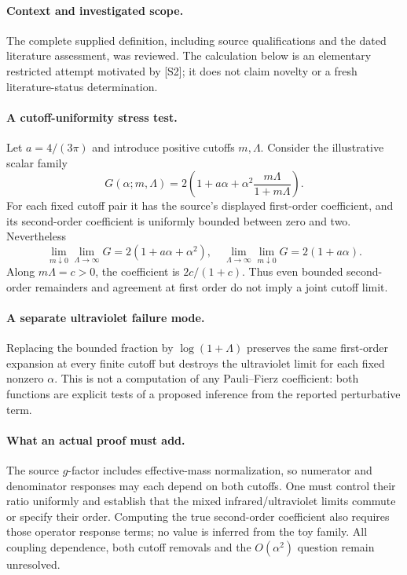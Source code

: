 \documentclass[11pt]{article}
\begin{document}
\paragraph{Context and investigated scope.} The complete supplied definition, including source qualifications and the dated literature assessment, was reviewed. The calculation below is an elementary restricted attempt motivated by [S2]; it does not claim novelty or a fresh literature-status determination.

\paragraph{A cutoff-uniformity stress test.} Let $a=4/(3\pi)$ and introduce positive cutoffs $m,\Lambda$. Consider the illustrative scalar family
\[
 G(\alpha;m,\Lambda)=2\left(1+a\alpha+\alpha^2\frac{m\Lambda}{1+m\Lambda}\right).
\]
For each fixed cutoff pair it has the source's displayed first-order coefficient, and its second-order coefficient is uniformly bounded between zero and two. Nevertheless
\[
 \lim_{m\downarrow0}\lim_{\Lambda\to\infty}G=2(1+a\alpha+\alpha^2),\quad
 \lim_{\Lambda\to\infty}\lim_{m\downarrow0}G=2(1+a\alpha).
\]
Along $m\Lambda=c>0$, the coefficient is $2c/(1+c)$. Thus even bounded second-order remainders and agreement at first order do not imply a joint cutoff limit.

\paragraph{A separate ultraviolet failure mode.} Replacing the bounded fraction by $\log(1+\Lambda)$ preserves the same first-order expansion at every finite cutoff but destroys the ultraviolet limit for each fixed nonzero $\alpha$. This is not a computation of any Pauli--Fierz coefficient: both functions are explicit tests of a proposed inference from the reported perturbative term.

\paragraph{What an actual proof must add.} The source $g$-factor includes effective-mass normalization, so numerator and denominator responses may each depend on both cutoffs. One must control their ratio uniformly and establish that the mixed infrared/ultraviolet limits commute or specify their order. Computing the true second-order coefficient also requires those operator response terms; no value is inferred from the toy family. All coupling dependence, both cutoff removals and the $O(\alpha^2)$ question remain unresolved.
\end{document}
